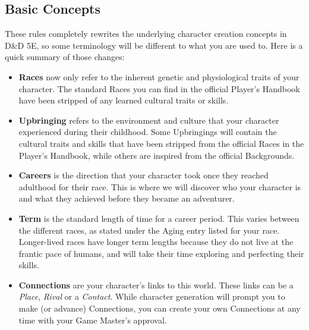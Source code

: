 \documentclass[10pt,twoside]{article}
\begin{document}
\begin{multicols}{2}

\tableofcontents

\newpage


\section{Basic Concepts}

These rules completely rewrites the underlying character creation concepts in D\&D 5E, so some terminology will be different to what you are used to. Here is a quick summary of those changes:

\begin{itemize}

\item \textbf{Races} now only refer to the inherent genetic and physiological traits of your character. The standard Races you can find in the official Player's Handbook have been stripped of any learned cultural traits or skills.

\item \textbf{Upbringing} refers to the environment and culture that your character experienced during their childhood. Some Upbringings will contain the cultural traits and skills that have been stripped from the official Races in the Player's Handbook, while others are inspired from the official Backgrounds.

\item \textbf{Careers} is the direction that your character took once they reached adulthood for their race. This is where we will discover who your character is and what they achieved before they became an adventurer.

\item \textbf{Term} is the standard length of time for a career period. This varies between the different races, as stated under the Aging entry listed for your race. Longer-lived races have longer term lengths because they do not live at the frantic pace of humans, and will take their time exploring and perfecting their skills.

\item \textbf{Connections} are your character's links to this world. These links can be a \textit{Place}, \textit{Rival} or a \textit{Contact}. While character generation will prompt you to make (or advance) Connections, you can create your own Connections at any time with your Game Master's approval.


\end{itemize}
\end{multicols}
\end{document}
